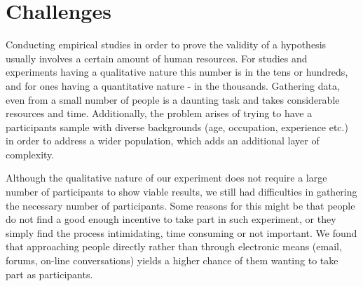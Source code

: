 \section{Challenges}
\label{section:challenges}

Conducting empirical studies in order to prove the validity of a hypothesis usually involves a certain amount of human resources. For studies and experiments having a qualitative nature this number is in the tens or hundreds, and for ones having a quantitative nature - in the thousands. Gathering data, even from a small number of people is a daunting task and takes considerable resources and time. Additionally, the problem arises of trying to have a participants sample with diverse backgrounds (age, occupation, experience etc.) in order to address a wider population, which adds an additional layer of complexity. 

Although the qualitative nature of our experiment does not require a large number of participants to show viable results, we still had difficulties in gathering the necessary number of participants. Some  reasons for this might be that people do not find a good enough incentive to take part in such experiment, or they simply find the process intimidating, time consuming or not important. We found that approaching people directly rather than through electronic means (email, forums, on-line conversations) yields a higher chance of them wanting to take part as participants. 

